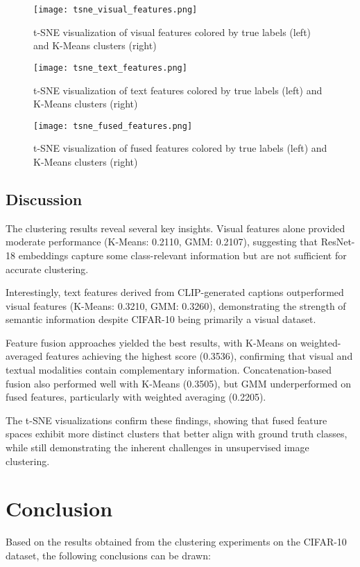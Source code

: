 \documentclass[12pt]{article}
\begin{document}
\begin{figure}[H]
    \centering
    \texttt{[image: tsne\_visual\_features.png]}
    \caption{t-SNE visualization of visual features colored by true labels (left) and K-Means clusters (right)}
    \label{fig:tsne_visual}
\end{figure}

\begin{figure}[H]
    \centering
    \texttt{[image: tsne\_text\_features.png]}
    \caption{t-SNE visualization of text features colored by true labels (left) and K-Means clusters (right)}
    \label{fig:tsne_text}
\end{figure}

\begin{figure}[H]
    \centering
    \texttt{[image: tsne\_fused\_features.png]}
    \caption{t-SNE visualization of fused features colored by true labels (left) and K-Means clusters (right)}
    \label{fig:tsne_fused}
\end{figure}

\subsection{Discussion}
The clustering results reveal several key insights. Visual features alone provided moderate performance (K-Means: 0.2110, GMM: 0.2107), suggesting that ResNet-18 embeddings capture some class-relevant information but are not sufficient for accurate clustering.

Interestingly, text features derived from CLIP-generated captions outperformed visual features (K-Means: 0.3210, GMM: 0.3260), demonstrating the strength of semantic information despite CIFAR-10 being primarily a visual dataset.

Feature fusion approaches yielded the best results, with K-Means on weighted-averaged features achieving the highest score (0.3536), confirming that visual and textual modalities contain complementary information. Concatenation-based fusion also performed well with K-Means (0.3505), but GMM underperformed on fused features, particularly with weighted averaging (0.2205).

The t-SNE visualizations confirm these findings, showing that fused feature spaces exhibit more distinct clusters that better align with ground truth classes, while still demonstrating the inherent challenges in unsupervised image clustering.

\section{Conclusion}
Based on the results obtained from the clustering experiments on the CIFAR-10 dataset, the following conclusions can be drawn:
\end{document}
